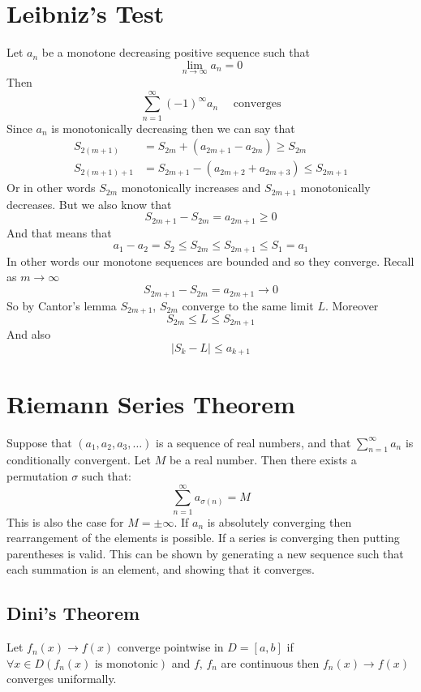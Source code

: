\documentclass[11pt,a4paper]{article}
\theoremstyle{definition}
\theoremstyle{plain}
\begin{document}
	\newpage
	
	\section{Leibniz's Test}
	Let $a_n$ be a monotone decreasing positive sequence such that
	\[
		\lim_{n\to\infty}{a_n}=0
	\]
	Then
	\[
		\sum_{n=1}^{\infty}(-1)^{\infty}{a_n} \quad \text{ converges}
	\]
	Since $a_n$ is monotonically decreasing then we can say that
	\begin{align*}
		S_{2(m+1)} &= S_{2m} + (a_{2m+1} - a_{2m}) \ge S_{2m}\\
		S_{2(m+1)+1} &= S_{2m + 1} - (a_{2m+2} + a_{2m+3}) \le S_{2m + 1}
	\end{align*}
	Or in other words $S_{2m}$ monotonically increases and 
	$S_{2m+1}$  monotonically decreases. 
	But we also know that
	\[
		S_{2m+1} - S_{2m} =  a_{2m + 1} \ge 0
	\]
	And that means that
	\[
		a_1-a_2=S_2\le S_{2m}\le S_{2m+1}\le S_1 = a_1
	\]
	In other words our monotone sequences are bounded and so they converge. 
	Recall as $m\to\infty$
	\[
		S_{2m+1} - S_{2m} =  a_{2m + 1} \to 0
	\]
	So by Cantor's lemma $S_{2m+1}$, $S_{2m}$ converge to the same limit $L$. Moreover
	\[
		S_{2m}\le L \le S_{2m+1}
	\]
	And also
	\[
		|S_k-L|\le a_{k+1}
	\]
	
	\newpage
	
	\section{Riemann Series Theorem}
	Suppose that $(a_{1}, a_{2}, a_{3}, \ldots)$ is a sequence of real numbers, 
	and that $\sum_{n=1}^\infty{a_n}$ is conditionally convergent. 
	Let $M$ be a real number. Then there exists a permutation $\sigma$ such that:
	\[
		\sum_{n=1}^{\infty}a_{\sigma(n)}=M
	\] 
	This is also the case for $M = \pm \infty$.
	If $a_n$ is absolutely converging then rearrangement of the elements is possible.
	If a series is converging then putting parentheses is valid.
	This can be shown by generating a new sequence such that each summation is an element, 
	and showing that it converges.
	 	
	\subsection{Dini's Theorem}
	Let $f_n(x)\to f(x)$ converge pointwise in $D=[a,b]$ if 
	$\forall x \in D(f_n(x) \text{ is monotonic})$ and $f$, $f_n$ are continuous 
	then $f_n(x) \to f(x)$ converges uniformally.
	
\end{document}
